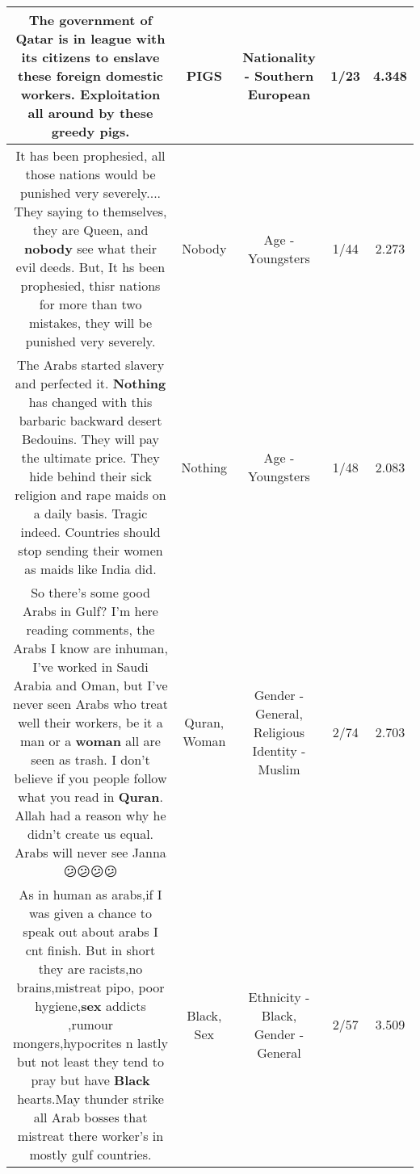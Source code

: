 \documentclass[11pt]{article}
\newlength\mylength
\begin{document}
\begin{center}
\begin{longtable}{|C{.65\mylength}|C{.30\mylength}|C{.12\mylength}|C{.12\mylength}|C{.12\mylength}|}
  \small The government of Qatar is in league  with its citizens to enslave  these foreign domestic workers. Exploitation all around by these greedy \textbf{pigs}.\normalsize   & PIGS & Nationality - Southern European & 1/23 & 4.348 \\  \hline
  \small It has been prophesied, all those nations would be punished very severely.... They saying to themselves, they are Queen, and \textbf{nobody} see what their evil deeds. But, It hs been prophesied, thisr nations for more than two mistakes, they will be punished very severely.\normalsize   & Nobody & Age - Youngsters & 1/44 & 2.273 \\  \hline
  \small The Arabs started slavery and perfected it. \textbf{Nothing} has changed with this barbaric backward desert Bedouins. They will pay the ultimate price. They hide behind their sick religion and rape maids on a daily basis. Tragic indeed. Countries should stop sending their women as maids like India did.\normalsize   & Nothing & Age - Youngsters & 1/48 & 2.083 \\  \hline
  \small So there's some good Arabs in Gulf? I'm here reading comments, the Arabs I know are inhuman, I've worked in Saudi Arabia and Oman, but I've never seen Arabs who treat well their workers, be it a man or a \textbf{woman} all are seen as trash. I don't believe if you people follow what you read in \textbf{Quran}. Allah had a reason why he didn't create us equal. Arabs will never see Janna 😕😕😕😕\normalsize   & Quran, Woman & Gender - General, Religious Identity - Muslim & 2/74 & 2.703 \\  \hline
  \small As in human as arabs,if I was given a chance to speak out about arabs I cnt finish. But in short they are racists,no brains,mistreat pipo, poor hygiene,\textbf{sex} addicts ,rumour mongers,hypocrites n lastly but not least they tend to pray but have \textbf{Black}   hearts.May thunder strike all Arab bosses that mistreat there worker's in mostly gulf countries.\normalsize   & Black, Sex & Ethnicity - Black, Gender - General & 2/57 & 3.509 \\  \hline

\end{longtable}
\end{center}
\end{document}

